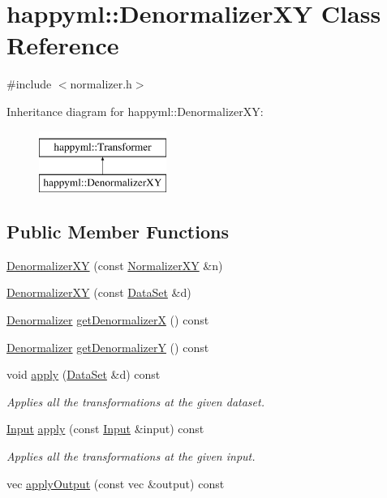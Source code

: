 \hypertarget{classhappyml_1_1DenormalizerXY}{}\section{happyml\+:\+:Denormalizer\+XY Class Reference}
\label{classhappyml_1_1DenormalizerXY}


{\ttfamily \#include $<$normalizer.\+h$>$}

Inheritance diagram for happyml\+:\+:Denormalizer\+XY\+:\begin{figure}[H]
\begin{center}
\leavevmode
\includegraphics[height=2.000000cm]{classhappyml_1_1DenormalizerXY}
\end{center}
\end{figure}
\subsection*{Public Member Functions}
\begin{DoxyCompactItemize}
\item 
\hyperlink{classhappyml_1_1DenormalizerXY_a1b239c3b51956722ce3905f80e4eef39}{Denormalizer\+XY} (const \hyperlink{classhappyml_1_1NormalizerXY}{Normalizer\+XY} \&n)
\item 
\hyperlink{classhappyml_1_1DenormalizerXY_a4b3fe341234bc43b3d1081551d80b2f1}{Denormalizer\+XY} (const \hyperlink{classhappyml_1_1DataSet}{Data\+Set} \&d)
\item 
\hyperlink{classhappyml_1_1Denormalizer}{Denormalizer} \hyperlink{classhappyml_1_1DenormalizerXY_a0524c3c50116d2d268b8eef1071f6c1b}{get\+DenormalizerX} () const 
\item 
\hyperlink{classhappyml_1_1Denormalizer}{Denormalizer} \hyperlink{classhappyml_1_1DenormalizerXY_ae7bc2c630b4698bf61ea198e7cd98563}{get\+DenormalizerY} () const 
\item 
void \hyperlink{classhappyml_1_1DenormalizerXY_a724e14e520004b2d66611c0e152a9d3b}{apply} (\hyperlink{classhappyml_1_1DataSet}{Data\+Set} \&d) const 
\begin{DoxyCompactList}\small\item\em Applies all the transformations at the given dataset. \end{DoxyCompactList}\item 
\hyperlink{namespacehappyml_a03602d1ec49393790b8a0449f40cd01f}{Input} \hyperlink{classhappyml_1_1DenormalizerXY_a22e45e0e3595ede802dca4c4cf772a73}{apply} (const \hyperlink{namespacehappyml_a03602d1ec49393790b8a0449f40cd01f}{Input} \&input) const 
\begin{DoxyCompactList}\small\item\em Applies all the transformations at the given input. \end{DoxyCompactList}\item 
vec \hyperlink{classhappyml_1_1DenormalizerXY_ab913bbdbdb38eae5f182345d1d9a7014}{apply\+Output} (const vec \&output) const 
\end{DoxyCompactItemize}
